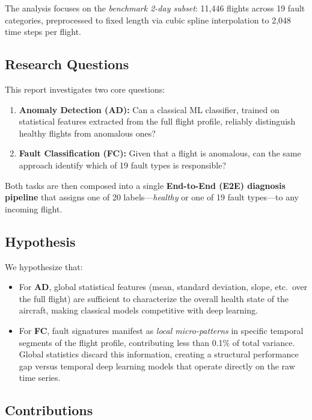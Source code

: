 The analysis focuses on the \textit{benchmark 2-day subset}: 11{,}446 flights
across 19 fault categories, preprocessed to fixed length via cubic spline
interpolation to 2{,}048 time steps per flight.

\subsection{Research Questions}

This report investigates two core questions:

\begin{enumerate}
    \item \textbf{Anomaly Detection (AD):} Can a classical ML classifier, trained
          on statistical features extracted from the full flight profile, reliably
          distinguish healthy flights from anomalous ones?
    \item \textbf{Fault Classification (FC):} Given that a flight is anomalous,
          can the same approach identify which of 19 fault types is responsible?
\end{enumerate}

Both tasks are then composed into a single \textbf{End-to-End (E2E) diagnosis
pipeline} that assigns one of 20 labels---\textit{healthy} or one of 19
fault types---to any incoming flight.

\subsection{Hypothesis}

We hypothesize that:

\begin{itemize}
    \item For \textbf{AD}, global statistical features (mean, standard deviation,
          slope, etc.\ over the full flight) are sufficient to characterize the
          overall health state of the aircraft, making classical models competitive
          with deep learning.
    \item For \textbf{FC}, fault signatures manifest as \textit{local micro-patterns}
          in specific temporal segments of the flight profile, contributing less
          than 0.1\% of total variance. Global statistics discard this information,
          creating a structural performance gap versus temporal deep learning models
          that operate directly on the raw time series.
\end{itemize}

\subsection{Contributions}

